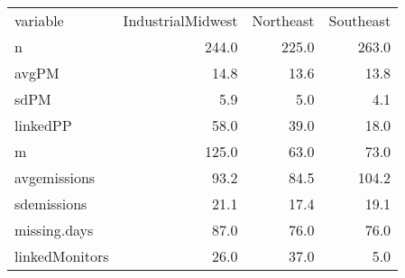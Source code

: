 \begin{table}[ht]
\centering
\begin{tabular}{lrrr}
 variable & IndustrialMidwest & Northeast & Southeast \\ 
 n & 244.0 & 225.0 & 263.0 \\ 
  avgPM & 14.8 & 13.6 & 13.8 \\ 
  sdPM & 5.9 & 5.0 & 4.1 \\ 
  linkedPP & 58.0 & 39.0 & 18.0 \\ 
   \hline
m & 125.0 & 63.0 & 73.0 \\ 
  avgemissions & 93.2 & 84.5 & 104.2 \\ 
  sdemissions & 21.1 & 17.4 & 19.1 \\ 
  missing.days & 87.0 & 76.0 & 76.0 \\ 
  linkedMonitors & 26.0 & 37.0 & 5.0 \\ 
  \end{tabular}
\end{table}
